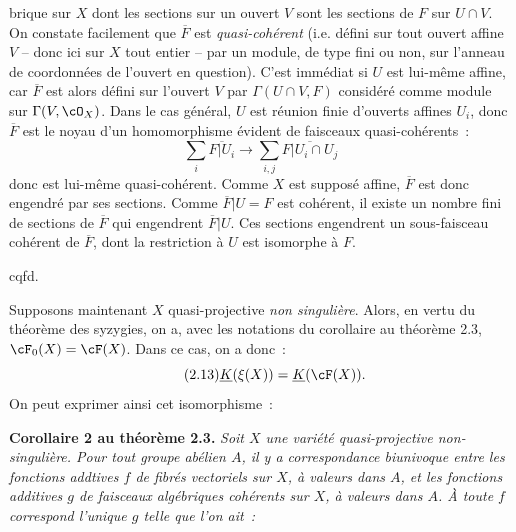 brique sur $X$ dont les sections sur un ouvert $V$ sont les sections de $F$ sur $U\cap V$. On constate facilement que $\overline F$ est \emph{quasi-cohérent} (i.e. défini sur tout ouvert affine $V$ -- donc ici sur $X$ tout entier -- par un module, de type fini ou non, sur l'anneau de coordonnées de l'ouvert en question). C'est immédiat si $U$ est lui-même affine, car $\overline F$ est alors défini sur l'ouvert $V$ par $\Gamma(U\cap V,F)$ considéré comme module sur $\Gamma(V,\cO_X)$. Dans le cas général, $U$ est réunion finie d'ouverts affines $U_i$, donc $\overline F$ est le noyau d'un homomorphisme évident de faisceaux quasi-cohérents~:
\[
 \sum_i \overline{F|U_i}\longrightarrow \sum_{i,j}\overline{F|U_i\cap U_j}
\]
donc est lui-même quasi-cohérent. Comme $X$ est supposé affine, $\overline F$ est donc engendré par ses sections. Comme $\overline F|U=F$ est cohérent, il existe un nombre fini de sections de $\overline F$ qui engendrent $\overline F|U$. Ces sections engendrent un sous-faisceau cohérent de $\overline F$, dont la restriction à $U$ est isomorphe à $F$.
\begin{flushright}cqfd.\end{flushright}

Supposons maintenant $X$ quasi-projective \emph{non singulière}. Alors, en vertu du théorème des syzygies, on a, avec les notations du corollaire au théorème 2.3, $\cF_0(X)=\cF(X)$. Dans ce cas, on a donc~:
\begin{equation}\tag{2.13}
 \underline{K}(\xi(X))=\underline{K}(\cF(X)).
\end{equation}
On peut exprimer ainsi cet isomorphisme~:

\textbf{Corollaire 2 au théorème 2.3.} \emph{Soit $X$ une variété quasi-projective non-singulière. Pour tout groupe abélien $A$, il y a correspondance biunivoque entre les fonctions addtives $f$ de fibrés vectoriels sur $X$, à valeurs dans $A$, et les fonctions additives $g$ de faisceaux algébriques cohérents sur $X$, à valeurs dans $A$. À toute $f$ correspond l'unique $g$ telle que l'on ait~:}
